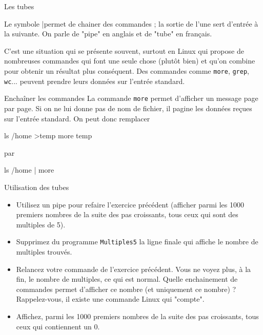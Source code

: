 \documentclass[a4paper,11pt]{article}
\begin{document}
			\begin{coltbox}{Les tubes}
		
				Le symbole \guillemotleft |\guillemotright  permet de chainer des commandes ; la sortie de l'une sert d'entr\'ee \`a la suivante. 
				On parle de "pipe" en anglais et de "tube" en fran\c cais.
					
			\end{coltbox}

			C'est une situation qui se pr\'esente souvent, surtout en Linux qui propose de nombreuses
			commandes qui font une seule chose (plut\^ot bien) et qu'on combine pour obtenir 
			un r\'esultat plus cons\'equent. Des commandes comme \verb_more_, \verb_grep_,
			\verb_wc_... peuvent prendre leurs donn\'ees sur l'entr\'ee standard.
					
          
		\begin{Exemple}{Enchaîner les commandes} 
			La commande \verb_more_ permet d'afficher un message page par page.
			Si on ne lui donne pas de nom de fichier, il pagine les donn\'ees re\c cues sur l'entr\'ee standard. 
			On peut donc remplacer
				
                  	 \begin{Console}
				ls /home >temp
				more temp
			\end{Console}
					par
				
                		 \begin{Console}
				ls /home | more
			\end{Console}
			
		\end{Exemple}
			
		\begin{Exercice}{Utilisation des tubes}
				\begin{itemize}
				
						\item Utilisez un pipe pour refaire l'exercice pr\'ec\'edent
						(afficher parmi les 1000 premiers nombres de la suite des pas croissants,
						tous ceux qui sont des multiples de 5).
					
						\item Supprimez du programme \verb_Multiples5_
							la ligne finale qui affiche le nombre de multiples trouv\'es. 
					
						\item Relancez votre commande de l'exercice pr\'ec\'edent.
							Vous ne voyez plus, \`a la fin, le nombre de multiples, ce qui est normal.
							Quelle enchainement de commandes permet d'afficher ce nombre
							(et uniquement ce nombre) ? Rappelez-vous, il existe une commande Linux qui "compte". 
					
						\item Affichez, parmi les 1000 premiers nombres 
							de la suite des pas croissants, tous ceux qui contiennent un 0.
					
					\end{itemize}
	\end{Exercice}
\end{document}
